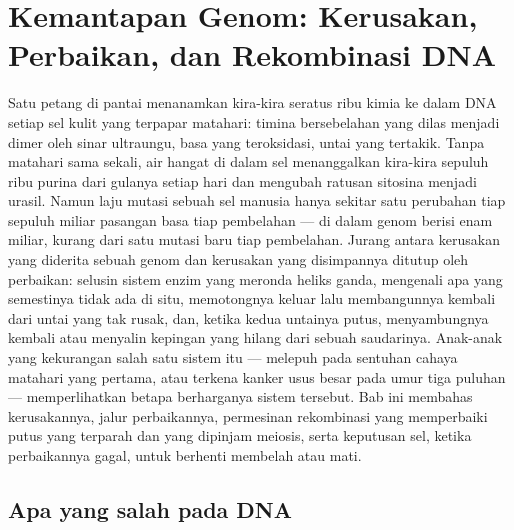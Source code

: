 \chapter{Kemantapan Genom: Kerusakan, Perbaikan, dan Rekombinasi DNA}\label{ch:b3:dna-repair}

Satu petang di pantai menanamkan kira-kira seratus ribu  kimia ke dalam
DNA setiap sel kulit yang terpapar matahari: timina bersebelahan yang dilas
menjadi dimer oleh sinar ultraungu, basa yang teroksidasi, untai yang
tertakik. Tanpa matahari sama sekali, air hangat di dalam sel menanggalkan
kira-kira sepuluh ribu purina dari gulanya setiap hari dan mengubah ratusan
sitosina menjadi urasil. Namun laju mutasi sebuah sel manusia hanya sekitar
satu perubahan tiap sepuluh miliar pasangan basa tiap pembelahan --- di dalam
genom berisi enam miliar, kurang dari satu mutasi baru tiap pembelahan.
Jurang antara kerusakan yang diderita sebuah genom dan kerusakan yang
disimpannya ditutup oleh perbaikan: selusin sistem enzim yang meronda heliks
ganda, mengenali apa yang semestinya tidak ada di situ, memotongnya keluar
lalu membangunnya kembali dari untai yang tak rusak, dan, ketika kedua
untainya putus, menyambungnya kembali atau menyalin kepingan yang hilang dari
sebuah saudarinya. Anak-anak yang kekurangan salah satu sistem itu ---
melepuh pada sentuhan cahaya matahari yang pertama, atau terkena kanker usus
besar pada umur tiga puluhan --- memperlihatkan betapa berharganya sistem
tersebut. Bab ini membahas kerusakannya, jalur perbaikannya, permesinan
rekombinasi yang memperbaiki putus yang terparah dan yang dipinjam meiosis,
serta keputusan sel, ketika perbaikannya gagal, untuk berhenti membelah atau
mati.

\section{Apa yang salah pada DNA}


